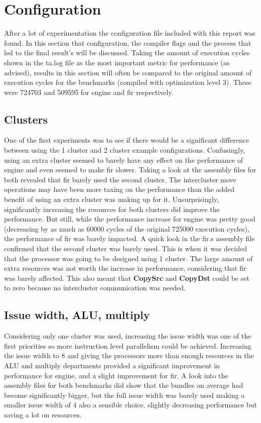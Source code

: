 \section{Configuration}
After a lot of experimentation the configuration file included with this report was found. In this section that configuration, the compiler flags and the process that led to the final result's will be discussed. Taking the amount of execution cycles shown in the ta.log file as the most important metric for performance (as advised), results in this section will often be compared to the original amount of execution cycles for the benchmarks (compiled with optimization level 3). These were 724703 and 509595 for engine and fir respectively.

\subsection{Clusters}
One of the first experiments was to see if there would be a significant difference between using the 1 cluster and 2 cluster example configurations. Confusingly, using an extra cluster seemed to barely have any effect on the performance of engine and even seemed to make fir slower. Taking a look at the assembly files for both revealed that fir barely used the second cluster. The intercluster move operations may have been more taxing on the performance than the added benefit of using an extra cluster was making up for it. Unsurprisingly, significantly increasing the resources for both clusters did improve the performance. But still, while the performance increase for engine was pretty good (decreasing by as much as 60000 cycles of the original 725000 execution cycles), the performance of fir was barely impacted. A quick look in the fir.s assembly file confirmed that the second cluster was barely used. This is when it was decided that the processor was going to be designed using 1 cluster. The large amount of extra resources was not worth the increase in performance, considering that fir was barely affected. This also meant that \textbf{CopySrc} and \textbf{CopyDst} could be set to zero because no intercluster communication was needed.

\subsection{Issue width, ALU, multiply}
Considering only one cluster was used, increasing the issue width was one of the first priorities so more instruction level parallelism could be achieved. Increasing the issue width to 8 and giving the processors more than enough resources in the ALU and multiply departments provided a significant improvement in performance for engine, and a slight improvement for fir. A look into the assembly files for both benchmarks did show that the bundles on average had become significantly bigger, but the full issue width was barely used making a smaller issue width of 4 also a sensible choice, slightly decreasing performance but saving a lot on resources.

